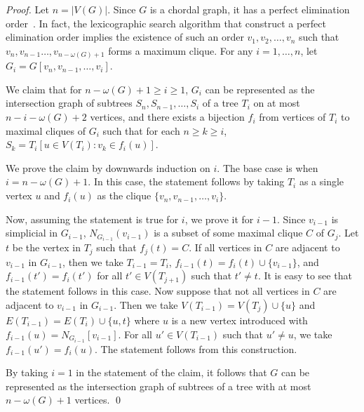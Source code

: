\documentclass[letter,runningheads,envcountsame,envcountsect]{llncs}
\begin{document}
\begin{proof}
Let $n = |V(G)|$. Since $G$ is a chordal graph, it has a perfect elimination order~\cite{golumbic2004algorithmic}. In fact, the lexicographic search algorithm that construct a perfect elimination order implies the existence of such an order $v_1, v_2, \dots, v_n$ such that $v_n, v_{n-1}\dots, v_{n-\omega(G)+1}$ forms a maximum clique. For any $i = 1,\ldots,n$, let $G_i=G[{v_n,v_{n-1},\dots, v_i}]$.

We claim that for $n-\omega(G)+1\ge i\ge 1$, $G_i$ can be represented as the intersection graph of subtrees $S_n,S_{n-1},\dots, S_i$ of a tree $T_i$ on at most $n-i-\omega(G)+2$ vertices, and there exists a bijection $f_i$ from vertices of $T_i$ to maximal cliques of $G_i$ such that for each $n\ge k\ge i$, $S_k=T_i[{u\in V(T_i): v_k\in f_i(u)}]$. 

We prove the claim by downwards induction on $i$. The base case is when $i=n-\omega(G)+1$. In this case, the statement follows by taking $T_i$ as a single vertex $u$ and $f_i(u)$ as the clique $\{v_n,v_{n-1},\dots, v_i\}$.

Now, assuming the statement is true for $i$, we prove it for $i-1$. Since $v_{i-1}$ is simplicial in $G_{i-1}$, $N_{G_{i-1}}(v_{i-1})$ is a subset of some maximal clique $C$ of $G_j$. Let $t$ be the vertex in $T_j$ such that $f_j(t)=C$. If all vertices in $C$ are adjacent to $v_{i-1}$ in $G_{i-1}$, then we take $T_{i-1}=T_{i}$, $f_{i-1}(t)=f_i(t)\cup \{v_{i-1}\}$, and $f_{i-1}(t')=f_{i}(t')$ for all $t'\in V(T_{j+1})$ such that $t'\neq t$. It is easy to see that the statement follows in this case.	Now suppose that not all vertices in $C$ are adjacent to $v_{i-1}$ in $G_{i-1}$. Then we take $V(T_{i-1})=V(T_j)\cup \{u\}$ and $E(T_{i-1})=E(T_i)\cup \{u,t\}$ where $u$ is a new vertex introduced with $f_{i-1}(u)=N_{G_{i-1}}[v_{i-1}]$.	For all $u'\in V(T_{i-1})$ such that $u'\neq u$, we take $f_{i-1}(u')=f_{i}(u) $. The statement follows from this construction.

By taking $i=1$ in the statement of the claim, it follows that $G$ can be represented as the intersection graph of subtrees of a tree with at most $n-\omega(G)+1$ vertices.
\qed\end{proof}
\end{document}
